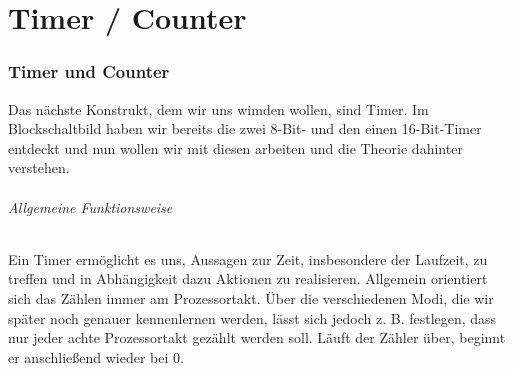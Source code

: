 \documentclass[11pt,a4paper]{scrartcl}
\begin{document}
\part{Timer / Counter}
\section{Timer und Counter}
Das nächste Konstrukt, dem wir uns wimden wollen, sind Timer. Im Blockschaltbild haben wir bereits die zwei 8-Bit- und den einen 16-Bit-Timer entdeckt und nun wollen wir mit diesen arbeiten und die Theorie dahinter verstehen.
\paragraph{Allgemeine Funktionsweise}
Ein Timer ermöglicht es uns, Aussagen zur Zeit, insbesondere der Laufzeit, zu treffen und in Abhängigkeit dazu Aktionen zu realisieren. Allgemein orientiert sich das Zählen immer am Prozessortakt. Über die verschiedenen Modi, die wir später noch genauer kennenlernen werden, lässt sich jedoch z. B. festlegen, dass nur jeder achte Prozessortakt gezählt werden soll. Läuft der Zähler über, beginnt er anschließend wieder bei 0.
\end{document}
